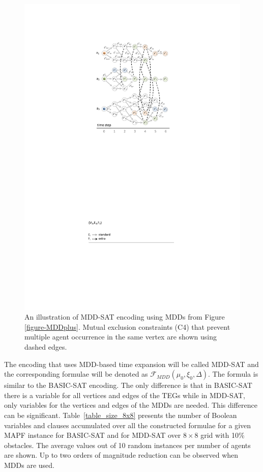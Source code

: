 \documentclass[jair,oneside,11pt]{article}
\begin{document}
\begin{figure}[h]
\centering
\includegraphics[trim={3.5cm 17.2cm 3.5cm 3.7cm},clip,width=1.0\textwidth]{fig_MDDencoding.pdf}
\caption{An illustration of MDD-SAT encoding using MDDs from Figure \ref{figure-MDDplus}. Mutual exclusion constraints (C4) that prevent multiple agent occurrence in the same vertex are shown using dashed edges.}
\label{figure-MDDencoding}
\end{figure}

The encoding that uses MDD-based time expansion will be called MDD-SAT and the corresponding formulae will be denoted as $\mathcal{F}_{MDD}(\mu_0, \xi_0, \Delta)$. The formula is similar to the BASIC-SAT encoding. The only difference is that in BASIC-SAT there is a variable for all vertices and edges of the TEGs while in MDD-SAT, only variables for the vertices and edges of the MDDs are needed. This difference can be significant. Table~\ref{table_size_8x8} presents the number of Boolean variables and clauses accumulated over all the constructed formulae for a given MAPF instance for BASIC-SAT and for MDD-SAT over $8 \times 8$ grid with 10\% obstacles. The average values out of 10 random instances per number of agents are shown. Up to two orders of magnitude reduction can be observed when MDDs are used.
\end{document}
